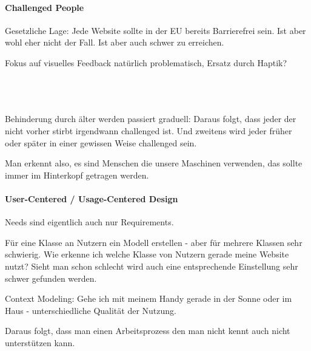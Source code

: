 \paragraph{Challenged People}

Gesetzliche Lage: Jede Website sollte in der EU bereits Barrierefrei sein. Ist 
aber wohl eher nicht der Fall. Ist aber auch schwer zu erreichen.

Fokus auf visuelles Feedback natürlich problematisch, Ersatz durch Haptik?

\\\\
\noindent{}
\\

Behinderung durch älter werden passiert graduell: Daraus folgt, dass jeder der nicht
vorher stirbt irgendwann challenged ist. Und zweitens wird jeder früher oder später
in einer gewissen Weise challenged sein.

Man erkennt also, es sind Menschen die unsere Maschinen verwenden, das sollte immer
im Hinterkopf getragen werden.

\paragraph{User-Centered / Usage-Centered Design}

Needs sind eigentlich auch nur Requirements.

Für eine Klasse an Nutzern ein Modell erstellen - aber für mehrere Klassen sehr 
schwierig. Wie erkenne ich welche Klasse von Nutzern gerade meine Website nutzt?
Sieht man schon schlecht wird auch eine entsprechende Einstellung sehr schwer
gefunden werden.

Context Modeling: Gehe ich mit meinem Handy gerade in der Sonne oder im Haus - 
unterschiedliche Qualität der Nutzung.

\noindent{}

Daraus folgt, dass man einen Arbeitsprozess den man nicht kennt auch nicht
unterstützen kann.

